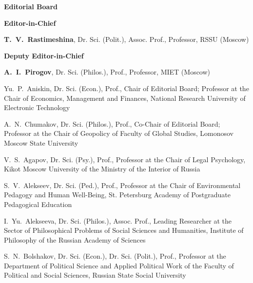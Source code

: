 
\begin{otherlanguage}{english}

\vspace*{-4em}

    \begin{center}
        \textbf{Editorial Board}
    \end{center}
    
    
    
    \begin{multicols}{2}
            
        \scriptsize
    
        \begin{center}
        \textbf{Editor-in-Chief}
        \end{center}
    
\noindent\textbf{T. V. Rastimeshina}, Dr. Sci. (Polit.), Assoc. Prof., Professor, RSSU (Moscow)
    
        \begin{center}
        \textbf{Deputy Editor-in-Chief}
        \end{center}
    
\noindent  \textbf{A. I. Pirogov}, Dr. Sci. (Philos.), Prof., Professor, MIET (Moscow)

 \vspace{2em}       
\noindent Yu. P. Aniskin, Dr. Sci. (Econ.), Prof., Chair of Editorial Board; Professor at the Chair of Economics, Management and Finances, National Research University of Electronic Technology

\noindent A. N. Chumakov, Dr. Sci. (Philos.), Prof., Co-Chair of Editorial Board; Professor at the Chair of Geopolicy of Faculty of Global Studies, Lomonosov Moscow State University

\noindent V. S. Agapov, Dr. Sci. (Psy.), Prof., Professor at the Chair of Legal Psychology, Kikot Moscow University of the Ministry of the Interior of Russia

\noindent S. V. Alekseev, Dr. Sci. (Ped.), Prof., Professor at the Chair of Environmental Pedagogy and Human Well-Being, St. Petersburg Academy of Postgraduate Pedagogical Education

\noindent I. Yu. Alekseeva, Dr. Sci. (Philos.), Assoc. Prof., Leading Researcher at the Sector of Philosophical Problems of Social Sciences and Humanities, Institute of Philosophy of the Russian Academy of Sciences

\noindent S. N. Bolshakov, Dr. Sci. (Econ.), Dr. Sci. (Polit.), Prof., Professor at the Department of Political Science and Applied Political Work of the Faculty of Political and Social Sciences, Russian State Social University


\end{multicols}
\end{otherlanguage}
